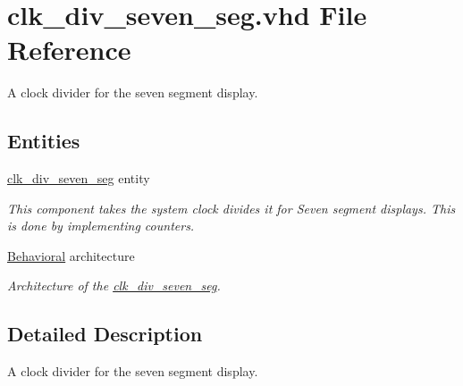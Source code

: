\hypertarget{clk__div__seven__seg_8vhd}{\section{clk\-\_\-div\-\_\-seven\-\_\-seg.\-vhd File Reference}
\label{clk__div__seven__seg_8vhd}
}


A clock divider for the seven segment display.  


\subsection*{Entities}
\begin{DoxyCompactItemize}
\item 
\hyperlink{classclk__div__seven__seg}{clk\-\_\-div\-\_\-seven\-\_\-seg} entity
\begin{DoxyCompactList}\small\item\em This component takes the system clock divides it for Seven segment displays. This is done by implementing counters. \end{DoxyCompactList}\item 
\hyperlink{classclk__div__seven__seg_1_1Behavioral}{Behavioral} architecture
\begin{DoxyCompactList}\small\item\em Architecture of the \hyperlink{classclk__div__seven__seg}{clk\-\_\-div\-\_\-seven\-\_\-seg}. \end{DoxyCompactList}\end{DoxyCompactItemize}


\subsection{Detailed Description}
A clock divider for the seven segment display. 